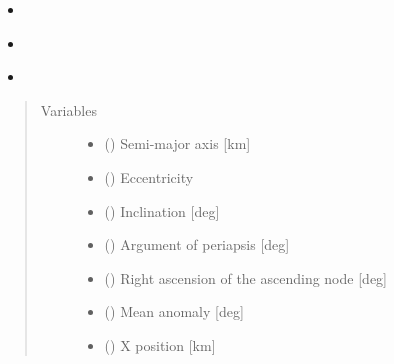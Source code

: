 \documentclass[letterpaper,10pt,english]{sphinxmanual}
\begin{document}
\begin{fulllineitems}
\begin{description}
\begin{itemize}
\item {} 
{\hyperref[\detokenize{modules/dpt_tools:dpt_tools.rot_mat_z}]{}}

\item {} 
{\hyperref[\detokenize{modules/dpt_tools:dpt_tools.gmst}]{}}

\item {} 
{\hyperref[\detokenize{modules/ccsds_write:ccsds_write.write_oem}]{}}

\end{itemize}

\end{description}
\begin{quote}\begin{description}
\item[{Variables}] \leavevmode\begin{itemize}
\item {} 
 () \textendash{} Semi-major axis {[}km{]}

\item {} 
 () \textendash{} Eccentricity

\item {} 
 () \textendash{} Inclination {[}deg{]}

\item {} 
 () \textendash{} Argument of periapsis {[}deg{]}

\item {} 
 () \textendash{} Right ascension of the ascending node {[}deg{]}

\item {} 
 () \textendash{} Mean anomaly {[}deg{]}

\item {} 
 () \textendash{} X position {[}km{]}


\end{itemize}
\end{description}
\end{quote}
\end{fulllineitems}
\end{document}
